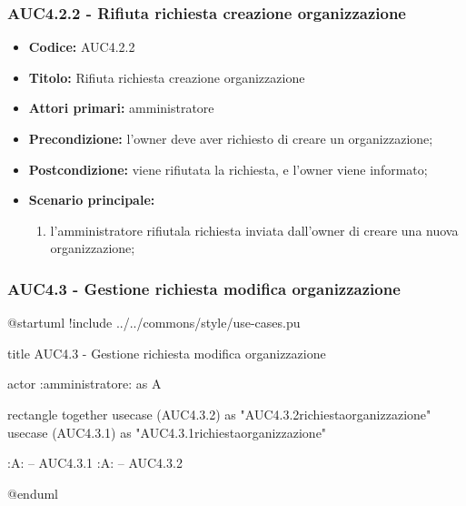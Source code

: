\documentclass[casi-duso]{subfiles}
\begin{document}
\subsubsection{AUC4.2.2 - Rifiuta richiesta creazione organizzazione}%
\label{subsub:AUC4.2.2}
\begin{itemize}
  \item \textbf{Codice:} AUC4.2.2
  \item \textbf{Titolo:} Rifiuta richiesta creazione organizzazione
  \item \textbf{Attori primari:} amministratore
  \item \textbf{Precondizione:} l'owner deve aver richiesto di creare un organizzazione;
  \item \textbf{Postcondizione:} viene rifiutata la richiesta, e l'owner viene informato;
  \item \textbf{Scenario principale:}
  \begin{enumerate}
    \item  l'amministratore rifiutala richiesta inviata dall'owner di creare una nuova organizzazione;
  \end{enumerate}
\end{itemize}

\subsubsection{AUC4.3 - Gestione richiesta modifica organizzazione}%
\label{subsub:AUC4.3}

\begin{plantuml}
@startuml
!include ../../commons/style/use-cases.pu

title AUC4.3 - Gestione richiesta modifica organizzazione

actor :amministratore: as A

rectangle {
  together {
    usecase (AUC4.3.2) as "AUC4.3.2\nRifiuta richiesta\nmodifica organizzazione"
    usecase (AUC4.3.1) as "AUC4.3.1\nAccetta richiesta\nmodifica organizzazione"
  }
}

:A: -- AUC4.3.1
:A: -- AUC4.3.2

@enduml
\end{plantuml}
\end{document}
